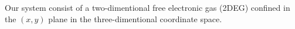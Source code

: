 
Our system consist of a two-dimentional free electronic gas (2DEG) confined in the $(x,y)$ plane in the three-dimentional coordinate space. 
